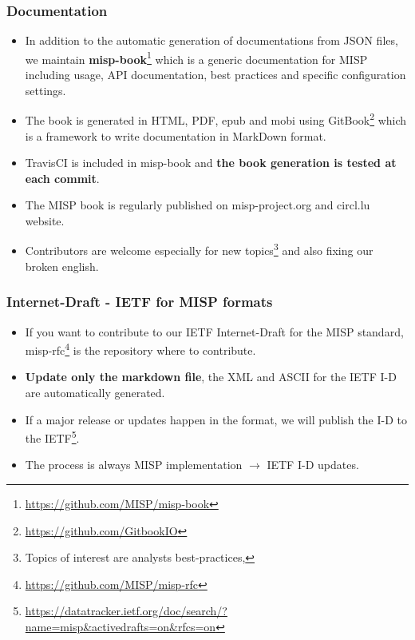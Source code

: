 \begin{frame}[t,plain]
\frametitle{Documentation}
\begin{itemize}
\item In addition to the automatic generation of documentations from JSON files, we maintain {\bf misp-book}\footnote{\url{https://github.com/MISP/misp-book}} which is a generic documentation for MISP including usage, API documentation, best practices and specific configuration settings.
\item The book is generated in HTML, PDF, epub and mobi using GitBook\footnote{\url{https://github.com/GitbookIO}} which is a framework to write documentation in MarkDown format.
\item TravisCI is included in misp-book and {\bf the book generation is tested at each commit}.
\item The MISP book is regularly published on misp-project.org and circl.lu website.
\item Contributors are welcome especially for new topics\footnote{Topics of interest are analysts best-practices, } and also fixing our broken english.
\end{itemize}
\end{frame}

\begin{frame}[t,plain]
\frametitle{Internet-Draft - IETF for MISP formats}
\begin{itemize}
\item If you want to contribute to our IETF Internet-Draft for the MISP standard, misp-rfc\footnote{\url{https://github.com/MISP/misp-rfc}} is the repository where to contribute.
\item {\bf Update only the markdown file}, the XML and ASCII for the IETF I-D are automatically generated.
\item If a major release or updates happen in the format, we will publish the I-D to the IETF\footnote{\url{https://datatracker.ietf.org/doc/search/?name=misp&activedrafts=on&rfcs=on}}.
\item The process is always MISP implementation $\rightarrow$ IETF I-D updates.
\end{itemize}

\end{frame}


